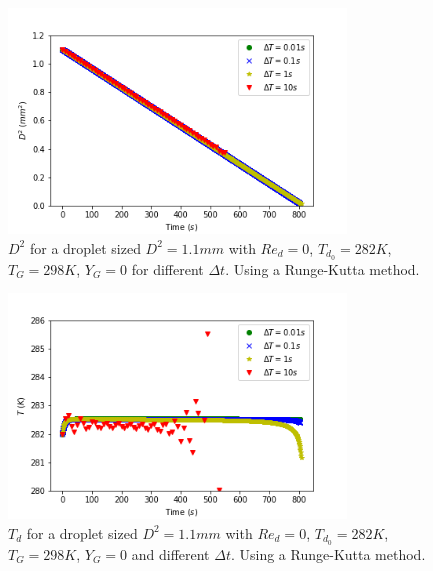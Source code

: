 \documentclass[]{article}
\begin{document}
\begin{figure}[h]
	\centering
	\includegraphics[width=0.8\textwidth]{heat_mass_runge_kutta_deltat_mass_lim_mass}
	\caption{$D^2$ for a droplet sized $D^2=1.1mm$ with $Re_d=0$, $T_{d_0}=282K$, $T_G=298K$, $Y_G=0$ for different $\Delta t$. Using a Runge-Kutta method.}
	\label{heat_mass_runge_kutta_deltat_mass_lim_mass}
\end{figure}

\begin{figure}[h]
	\centering
	\includegraphics[width=0.8\textwidth]{heat_mass_runge_kutta_deltat_mass_lim_temp}
	\caption{$T_d$ for a droplet sized $D^2=1.1mm$ with $Re_d=0$, $T_{d_0}=282K$, $T_G=298K$, $Y_G=0$ and different $\Delta t$. Using a Runge-Kutta method.}
	\label{heat_mass_runge_kutta_deltat_mass_lim_temp}
\end{figure}
\end{document}
